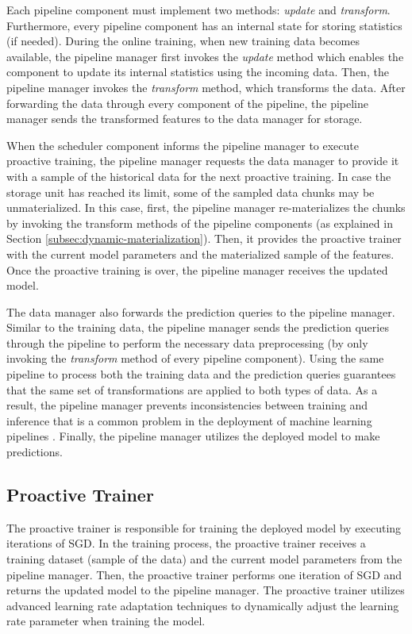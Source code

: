 Each pipeline component must implement two methods: \textit{update} and \textit{transform}.
Furthermore, every pipeline component has an internal state for storing statistics (if needed).
During the online training, when new training data becomes available, the pipeline manager first invokes the \textit{update} method which enables the component to update its internal statistics using the incoming data.
Then, the pipeline manager invokes the \textit{transform} method, which transforms the data.
After forwarding the data through every component of the pipeline, the pipeline manager sends the transformed features to the data manager for storage.

When the scheduler component informs the pipeline manager to execute proactive training, the pipeline manager requests the data manager to provide it with a sample of the historical data for the next proactive training.
In case the storage unit has reached its limit, some of the sampled data chunks may be unmaterialized.
In this case, first, the pipeline manager re-materializes the chunks by invoking the transform methods of the pipeline components (as explained in Section \ref{subsec:dynamic-materialization}).
Then, it provides the proactive trainer with the current model parameters and the materialized sample of the features.
Once the proactive training is over, the pipeline manager receives the updated model.

The data manager also forwards the prediction queries to the pipeline manager.
Similar to the training data, the pipeline manager sends the prediction queries through the pipeline to perform the necessary data preprocessing (by only invoking the \textit{transform} method of every pipeline component).
Using the same pipeline to process both the training data and the prediction queries guarantees that the same set of transformations are applied to both types of data.
As a result, the pipeline manager prevents inconsistencies between training and inference that is a common problem in the deployment of machine learning pipelines \cite{baylor2017tfx}.
Finally, the pipeline manager utilizes the deployed model to make predictions.

\subsection{Proactive Trainer} 
The proactive trainer is responsible for training the deployed model by executing iterations of SGD.
In the training process, the proactive trainer receives a training dataset (sample of the data) and the current model parameters from the pipeline manager.
Then, the proactive trainer performs one iteration of SGD and returns the updated model to the pipeline manager.
The proactive trainer utilizes advanced learning rate adaptation techniques to dynamically adjust the learning rate parameter when training the model.

